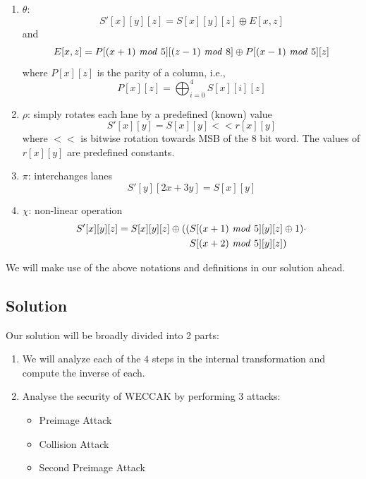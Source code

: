 \documentclass[10pt,twoside]{article}
\begin{document}
\begin{enumerate}
  \setlength\itemsep{0em}
  \item $\theta$: \newline
    $$S'[x][y][z] = S[x][y][z] \oplus E[x,z]$$
    and
    $$E[x,z] = P[(x+1)\ \text{\textit{mod}}\ 5][(z-1)\ \text{\textit{mod}}\ 8] \oplus P[(x-1)\ \text{\textit{mod}}\ 5][z]$$
    where $P[x][z]$ is the parity of a column, i.e.,
    $$P[x][z] = \bigoplus_{i=0}^{4} S[x][i][z]$$

  \item $\rho$: simply rotates each lane by a predefined (known) value \newline
    $$S'[x][y] = S[x][y] << r[x][y]$$
    where $<<$ is bitwise rotation towards MSB of the $8$ bit word. The values of $r[x][y]$ are predefined constants.

  \item $\pi$: interchanges lanes \newline
    $$S'[y][2x+3y] = S[x][y]$$

  \item $\chi$: non-linear operation \newline
    \begin{align*}
      S'[x][y][z] = S[x][y][z] \oplus ((&S[(x+1)\ \text{\textit{mod}}\ 5][y][z] \oplus 1)\cdot \\
      &S[(x+2)\ \text{\textit{mod}}\ 5][y][z])
    \end{align*}
\end{enumerate}

We will make use of the above notations and definitions in our solution ahead.

\subsection{Solution}

Our solution will be broadly divided into 2 parts:
\begin{enumerate}
  \setlength\itemsep{0em}
  \item We will analyze each of the $4$ steps in the internal transformation and compute the inverse of each.
  \item Analyse the security of WECCAK by performing 3 attacks:
    \begin{itemize}
      \setlength\itemsep{0em}
      \item Preimage Attack
      \item Collision Attack
      \item Second Preimage Attack
    \end{itemize}
\end{enumerate}
\end{document}
